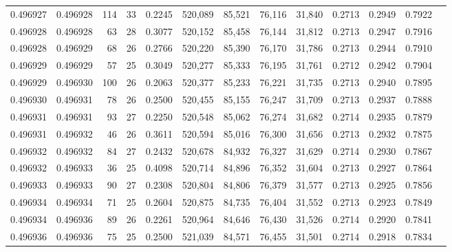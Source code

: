 \begin{tabular}{rrrrrrrrrrrrr}
0.496927 & 0.496928 & 114 &  33 &                                     0.2245 & 520,089 &  85,521 &  76,116 &  31,840 & 0.2713 & 0.2949 & 0.7922 \\
0.496928 & 0.496928 &  63 &  28 &                                     0.3077 & 520,152 &  85,458 &  76,144 &  31,812 & 0.2713 & 0.2947 & 0.7916 \\
0.496928 & 0.496929 &  68 &  26 &                                     0.2766 & 520,220 &  85,390 &  76,170 &  31,786 & 0.2713 & 0.2944 & 0.7910 \\
0.496929 & 0.496929 &  57 &  25 &                                     0.3049 & 520,277 &  85,333 &  76,195 &  31,761 & 0.2712 & 0.2942 & 0.7904 \\
0.496929 & 0.496930 & 100 &  26 &                                     0.2063 & 520,377 &  85,233 &  76,221 &  31,735 & 0.2713 & 0.2940 & 0.7895 \\
0.496930 & 0.496931 &  78 &  26 &                                     0.2500 & 520,455 &  85,155 &  76,247 &  31,709 & 0.2713 & 0.2937 & 0.7888 \\
0.496931 & 0.496931 &  93 &  27 &                                     0.2250 & 520,548 &  85,062 &  76,274 &  31,682 & 0.2714 & 0.2935 & 0.7879 \\
0.496931 & 0.496932 &  46 &  26 &                                     0.3611 & 520,594 &  85,016 &  76,300 &  31,656 & 0.2713 & 0.2932 & 0.7875 \\
0.496932 & 0.496932 &  84 &  27 &                                     0.2432 & 520,678 &  84,932 &  76,327 &  31,629 & 0.2714 & 0.2930 & 0.7867 \\
0.496932 & 0.496933 &  36 &  25 &                                     0.4098 & 520,714 &  84,896 &  76,352 &  31,604 & 0.2713 & 0.2927 & 0.7864 \\
0.496933 & 0.496933 &  90 &  27 &                                     0.2308 & 520,804 &  84,806 &  76,379 &  31,577 & 0.2713 & 0.2925 & 0.7856 \\
0.496934 & 0.496934 &  71 &  25 &                                     0.2604 & 520,875 &  84,735 &  76,404 &  31,552 & 0.2713 & 0.2923 & 0.7849 \\
0.496934 & 0.496936 &  89 &  26 &                                     0.2261 & 520,964 &  84,646 &  76,430 &  31,526 & 0.2714 & 0.2920 & 0.7841 \\
0.496936 & 0.496936 &  75 &  25 &                                     0.2500 & 521,039 &  84,571 &  76,455 &  31,501 & 0.2714 & 0.2918 & 0.7834 \\

\end{tabular}
